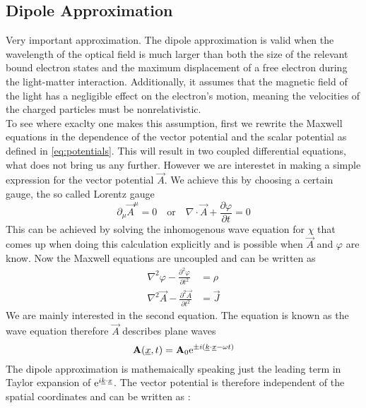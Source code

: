 \subsection{Dipole Approximation}
Very important approximation. 
The dipole approximation is valid when the wavelength of the optical field is much larger than both the size of the relevant bound electron states and the maximum displacement of a free electron during the light-matter interaction. 
Additionally, it assumes that the magnetic field of the light has a negligible effect on the electron's motion, meaning the velocities of the charged particles must be nonrelativistic. \\
To see where exaclty one makes this assumption, first we rewrite the Maxwell equations in the dependence of the vector potential and the scalar potential as defined in \eqref{eq:potentials}. 
This will result in two coupled differential equations, what does not bring us any further. 
However we are interestet in making a simple expression for the vector potential $\vec{A}$.
We achieve this by choosing a certain gauge, the so called Lorentz gauge
\begin{equation*}
    \partial_{\mu} \vec{A}^{\mu} = 0 \quad \text{or} \quad \nabla \cdot \vec{A} + \frac{\partial \varphi}{\partial t} = 0
\end{equation*}
This can be achieved by solving the inhomogenous wave equation for $\chi$ that comes up when doing this calculation explicitly and is possible when $\vec{A}$ and $\varphi$ are know.
Now the Maxwell equations are uncoupled and can be written as
\begin{equation*}
    \begin{aligned}
        \nabla^2 \varphi - \frac{\partial^2 \varphi}{\partial t^2} &= \rho \\
        \nabla^2 \vec{A} - \frac{\partial^2 \vec{A}}{\partial t^2} &= \vec{J} 
    \end{aligned}
\end{equation*}
We are mainly interested in the second equation. The equation is known as the wave equation therefore $\vec{A}$ describes plane waves
\begin{equation*}
    \mathbf{A}(\underline{x}, t) = \mathbf{A}_0 \mathrm{e}^{\pm i (\underline{k} \cdot \underline{x} - \omega t)}
\end{equation*}
The dipole approximation is mathemaically speaking just the leading term in Taylor expansion of $\mathrm{e}^{i\underline{k} \cdot \underline{x}}$. 
The vector potential is therefore independent of the spatial coordinates and can be written as \cite{bosmandipoleapprox}:
